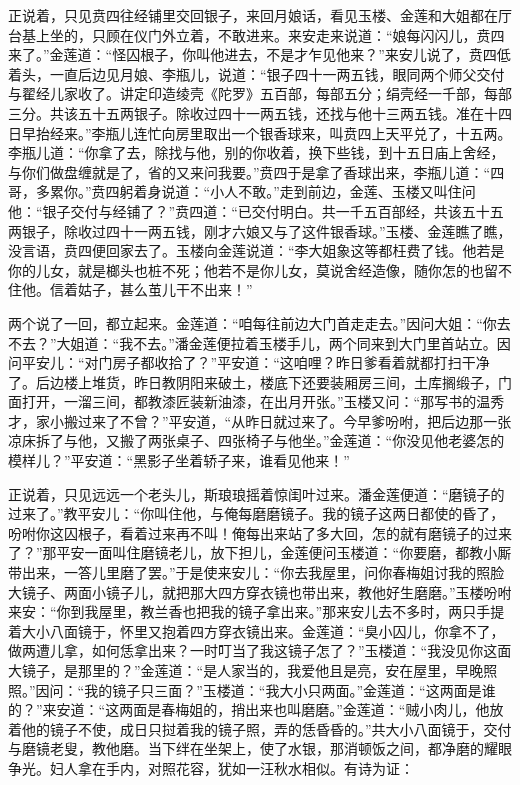 正说着，只见贲四往经铺里交回银子，来回月娘话，看见玉楼、金莲和大姐都在厅台基上坐的，只顾在仪门外立着，不敢进来。来安走来说道：“娘每闪闪儿，贲四来了。”金莲道：“怪囚根子，你叫他进去，不是才乍见他来？”来安儿说了，贲四低着头，一直后边见月娘、李瓶儿，说道：“银子四十一两五钱，眼同两个师父交付与翟经儿家收了。讲定印造绫壳《陀罗》五百部，每部五分；绢壳经一千部，每部三分。共该五十五两银子。除收过四十一两五钱，还找与他十三两五钱。准在十四日早抬经来。”李瓶儿连忙向房里取出一个银香球来，叫贲四上天平兑了，十五两。李瓶儿道：“你拿了去，除找与他，别的你收着，换下些钱，到十五日庙上舍经，与你们做盘缠就是了，省的又来问我要。”贲四于是拿了香球出来，李瓶儿道：“四哥，多累你。”贲四躬着身说道：“小人不敢。”走到前边，金莲、玉楼又叫住问他：“银子交付与经铺了？”贲四道：“已交付明白。共一千五百部经，共该五十五两银子，除收过四十一两五钱，刚才六娘又与了这件银香球。”玉楼、金莲瞧了瞧，没言语，贲四便回家去了。玉楼向金莲说道：“李大姐象这等都枉费了钱。他若是你的儿女，就是榔头也桩不死；他若不是你儿女，莫说舍经造像，随你怎的也留不住他。信着姑子，甚么茧儿干不出来！”

两个说了一回，都立起来。金莲道：“咱每往前边大门首走走去。”因问大姐：“你去不去？”大姐道：“我不去。”潘金莲便拉着玉楼手儿，两个同来到大门里首站立。因问平安儿：“对门房子都收拾了？”平安道：“这咱哩？昨日爹看着就都打扫干净了。后边楼上堆货，昨日教阴阳来破土，楼底下还要装厢房三间，土库搁缎子，门面打开，一溜三间，都教漆匠装新油漆，在出月开张。”玉楼又问：“那写书的温秀才，家小搬过来了不曾？”平安道，“从昨日就过来了。今早爹吩咐，把后边那一张凉床拆了与他，又搬了两张桌子、四张椅子与他坐。”金莲道：“你没见他老婆怎的模样儿？”平安道：“黑影子坐着轿子来，谁看见他来！”

正说着，只见远远一个老头儿，斯琅琅摇着惊闺叶过来。潘金莲便道：“磨镜子的过来了。”教平安儿：“你叫住他，与俺每磨磨镜子。我的镜子这两日都使的昏了，吩咐你这囚根子，看着过来再不叫！俺每出来站了多大回，怎的就有磨镜子的过来了？”那平安一面叫住磨镜老儿，放下担儿，金莲便问玉楼道：“你要磨，都教小厮带出来，一答儿里磨了罢。”于是使来安儿：“你去我屋里，问你春梅姐讨我的照脸大镜子、两面小镜子儿，就把那大四方穿衣镜也带出来，教他好生磨磨。”玉楼吩咐来安：“你到我屋里，教兰香也把我的镜子拿出来。”那来安儿去不多时，两只手提着大小八面镜于，怀里又抱着四方穿衣镜出来。金莲道：“臭小囚儿，你拿不了，做两遭儿拿，如何恁拿出来？一时叮当了我这镜子怎了？”玉楼道：“我没见你这面大镜子，是那里的？”金莲道：“是人家当的，我爱他且是亮，安在屋里，早晚照照。”因问：“我的镜子只三面？”玉楼道：“我大小只两面。”金莲道：“这两面是谁的？”来安道：“这两面是春梅姐的，捎出来也叫磨磨。”金莲道：“贼小肉儿，他放着他的镜子不使，成日只挝着我的镜子照，弄的恁昏昏的。”共大小八面镜于，交付与磨镜老叟，教他磨。当下绊在坐架上，使了水银，那消顿饭之间，都净磨的耀眼争光。妇人拿在手内，对照花容，犹如一汪秋水相似。有诗为证：

